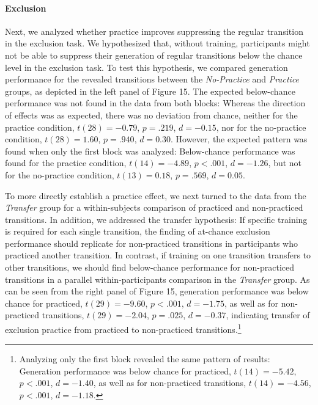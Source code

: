 \documentclass[floatsintext,man]{apa6}
\begin{document}
\paragraph{Exclusion}\label{exclusion}

Next, we analyzed whether practice improves suppressing the regular
transition in the exclusion task. We hypothesized that, without
training, participants might not be able to suppress their generation of
regular transitions below the chance level in the exclusion task. To
test this hypothesis, we compared generation performance for the
revealed transitions between the \emph{No-Practice} and \emph{Practice}
groups, as depicted in the left panel of Figure 15. The expected
below-chance performance was not found in the data from both blocks:
Whereas the direction of effects was as expected, there was no deviation
from chance, neither for the practice condition, \(t(28) = -0.79\),
\(p = .219\), \(d = -0.15\), nor for the no-practice condition,
\(t(28) = 1.60\), \(p = .940\), \(d = 0.30\). However, the expected
pattern was found when only the first block was analyzed: Below-chance
performance was found for the practice condition, \(t(14) = -4.89\),
\(p < .001\), \(d = -1.26\), but not for the no-practice condition,
\(t(13) = 0.18\), \(p = .569\), \(d = 0.05\).

To more directly establish a practice effect, we next turned to the data
from the \emph{Transfer} group for a within-subjects comparison of
practiced and non-practiced transitions. In addition, we addressed the
transfer hypothesis: If specific training is required for each single
transition, the finding of at-chance exclusion performance should
replicate for non-practiced transitions in participants who practiced
another transition. In contrast, if training on one transition transfers
to other transitions, we should find below-chance performance for
non-practiced transitions in a parallel within-participants comparison
in the \emph{Transfer} group. As can be seen from the right panel of
Figure 15, generation performance was below chance for practiced,
\(t(29) = -9.60\), \(p < .001\), \(d = -1.75\), as well as for
non-practiced transitions, \(t(29) = -2.04\), \(p = .025\),
\(d = -0.37\), indicating transfer of exclusion practice from practiced
to non-practiced transitions.\footnote{Analyzing only the first block
  revealed the same pattern of results: Generation performance was below
  chance for practiced, \(t(14) = -5.42\), \(p < .001\), \(d = -1.40\),
  as well as for non-practiced transitions, \(t(14) = -4.56\),
  \(p < .001\), \(d = -1.18\).}
\end{document}
